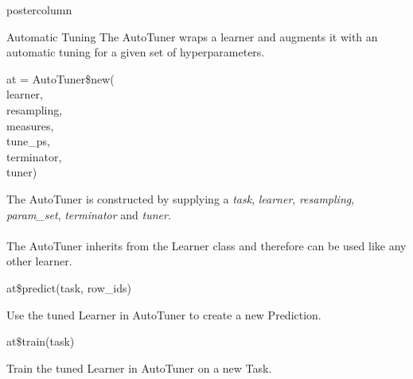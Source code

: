 \documentclass{beamer}
\begin{document}
\begin{frame}[fragile]{}
\begin{columns}
\begin{column}{.245\textwidth}
\begin{beamercolorbox}[center]{postercolumn}
\begin{minipage}{.98\textwidth}
{\begin{myblock}{Automatic Tuning}
						The AutoTuner wraps a learner and augments it with an automatic tuning for a given set of hyperparameters. 
						\\
						\begin{codeboxmultiline}[width=18cm]
							at = AutoTuner\$new(
\\
							\hspace*{1ex}learner,
\\
							\hspace*{1ex}resampling,
\\
							\hspace*{1ex}measures,
\\
							\hspace*{1ex}tune\_ps,
\\
							\hspace*{1ex}terminator,
\\
							\hspace*{1ex}tuner)
						\end{codeboxmultiline}
						The AutoTuner is constructed by supplying a \textit{task}, \textit{learner}, \textit{resampling}, \textit{param\_set}, \textit{terminator} and \textit{tuner}. 
						\\
						\\
						The AutoTuner inherits from the Learner class and therefore can be used like any other learner.
						\\
						\begin{codebox}
							at\$predict(task, row\_ids)
						\end{codebox}
						Use the tuned Learner in AutoTuner to create a new Prediction.
						\\
						\begin{codebox}
							at\$train(task)
						\end{codebox}
						Train the tuned Learner in AutoTuner on a new Task.
						\end{myblock}
					\vfill}
				\end{minipage}
			\end{beamercolorbox}
		\end{column}
	\end{columns}
\end{frame}
\end{document}
